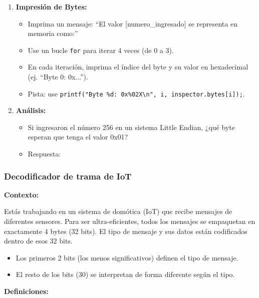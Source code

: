 \begin{enumerate}
    \item \textbf{Impresión de Bytes:}
    \begin{itemize}
        \item Imprima un mensaje: ``El valor [numero\_ingresado] se representa en memoria como:''
        \item Use un bucle \texttt{for} para iterar 4 veces (de 0 a 3).
        \item En cada iteración, imprima el índice del byte y su valor en hexadecimal (ej. ``Byte 0: 0x...'').
        \item Pista: use \texttt{printf("Byte \%d: 0x\%02X\textbackslash n", i, inspector.bytes[i]);}.
    \end{itemize}

    \item \textbf{Análisis:}
    \begin{itemize}
        \item Si ingresaron el número 256 en un sistema Little Endian, ¿qué byte esperan que tenga el valor 0x01?
        \item Respuesta:
    \end{itemize}
\end{enumerate}

\subsubsection{Decodificador de trama de IoT}

\textbf{Contexto:}

Estás trabajando en un sistema de domótica (IoT) que recibe mensajes de diferentes sensores. Para ser ultra-eficientes, todos los mensajes se empaquetan en exactamente 4 bytes (32 bits). El tipo de mensaje y sus datos están codificados dentro de esos 32 bits.

\begin{itemize}
    \item Los primeros 2 bits (los menos significativos) definen el tipo de mensaje.
    \item El resto de los bits (30) se interpretan de forma diferente según el tipo.
\end{itemize}

\textbf{Definiciones:}

